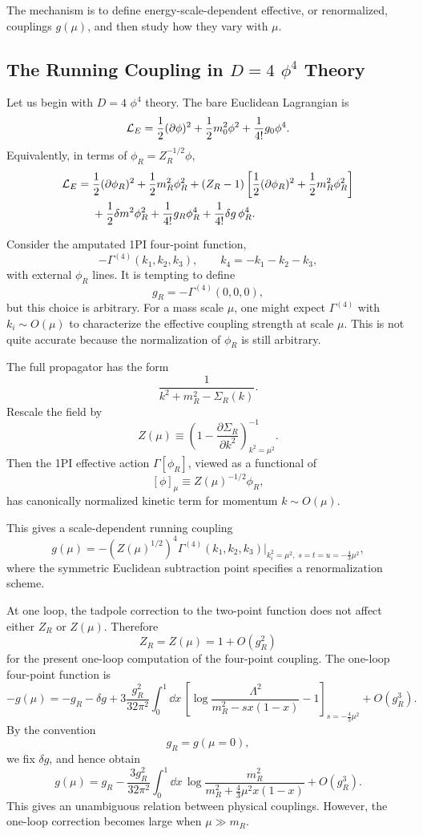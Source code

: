 The mechanism is to define energy-scale-dependent effective, or
renormalized, couplings \(g(\mu)\), and then study how they vary with
\(\mu\).

\subsection[The Running Coupling in D=4 phi4 Theory]
{The Running Coupling in \(D=4\) \(\phi^4\) Theory}

Let us begin with \(D=4\) \(\phi^4\) theory.  The bare Euclidean Lagrangian is
\[
  {\cal L}_E
  =
  \frac{1}{2}(\partial\phi)^2+\frac{1}{2}m_0^2\phi^2
  +\frac{1}{4!}g_0\phi^4 .
\]
Equivalently, in terms of \(\phi_R=Z_R^{-1/2}\phi\),
\[
\begin{split}
  {\cal L}_E
  ={}&
  \frac{1}{2}(\partial\phi_R)^2+\frac{1}{2}m_R^2\phi_R^2
  +(Z_R-1)
  \left[
    \frac{1}{2}(\partial\phi_R)^2+\frac{1}{2}m_R^2\phi_R^2
  \right]  \\
  &+\frac{1}{2}\delta m^2\phi_R^2
  +\frac{1}{4!}g_R\phi_R^4
  +\frac{1}{4!}\delta g\,\phi_R^4 .
\end{split}
\]

Consider the amputated 1PI four-point function,
\[
  -\Gamma^{(4)}(k_1,k_2,k_3),
  \qquad k_4=-k_1-k_2-k_3,
\]
with external \(\phi_R\) lines.  It is tempting to define
\[
  g_R=-\Gamma^{(4)}(0,0,0),
\]
but this choice is arbitrary.  For a mass scale \(\mu\), one might expect
\(\Gamma^{(4)}\) with \(k_i\sim O(\mu)\) to characterize the effective
coupling strength at scale \(\mu\).  This is not quite accurate because the
normalization of \(\phi_R\) is still arbitrary.

The full propagator has the form
\[
  \frac{1}{k^2+m_R^2-\Sigma_R(k)} .
\]
Rescale the field by
\[
  Z(\mu)
  \equiv
  \left(
    1-\frac{\partial\Sigma_R}{\partial k^2}
  \right)^{-1}_{k^2=\mu^2}.
\]
Then the 1PI effective action \(\Gamma[\phi_R]\), viewed as a functional of
\[
  [\phi]_\mu\equiv Z(\mu)^{-1/2}\phi_R,
\]
has canonically normalized kinetic term for momentum \(k\sim O(\mu)\).

This gives a scale-dependent running coupling
\[
  g(\mu)
  =
  -\left(Z(\mu)^{1/2}\right)^4
  \Gamma^{(4)}(k_1,k_2,k_3)
  \bigg|_{k_i^2=\mu^2,\;s=t=u=-\frac{4}{3}\mu^2},
\]
where the symmetric Euclidean subtraction point specifies a renormalization
scheme.

At one loop, the tadpole correction to the two-point function does not affect
either \(Z_R\) or \(Z(\mu)\).  Therefore
\[
  Z_R=Z(\mu)=1+O(g_R^2)
\]
for the present one-loop computation of the four-point coupling.  The
one-loop four-point function is
\[
  -g(\mu)
  =
  -g_R-\delta g
  +3\frac{g_R^2}{32\pi^2}
  \int_0^1\dd x\,
  \left[
    \log\frac{\Lambda^2}{m_R^2-sx(1-x)}-1
  \right]_{s=-\frac{4}{3}\mu^2}
  +O(g_R^3).
\]
By the convention
\[
  g_R=g(\mu=0),
\]
we fix \(\delta g\), and hence obtain
\[
  g(\mu)
  =
  g_R
  -\frac{3g_R^2}{32\pi^2}
  \int_0^1\dd x\,
  \log
  \frac{m_R^2}
       {m_R^2+\frac{4}{3}\mu^2x(1-x)}
  +O(g_R^3).
\]
This gives an unambiguous relation between physical couplings.  However, the
one-loop correction becomes large when \(\mu\gg m_R\).

